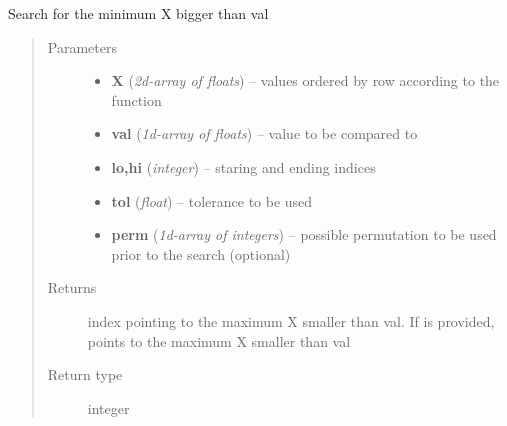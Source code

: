 \documentclass[letterpaper,10pt,english]{sphinxmanual}
\begin{document}

\begin{fulllineitems}
\label{index:SpectralToolbox.Misc.binary_search}
Search for the minimum X bigger than val
\begin{quote}\begin{description}
\item[{Parameters}] \leavevmode\begin{itemize}
\item {} 
\textbf{X} (\emph{2d-array of floats}) -- values ordered by row according to the  function

\item {} 
\textbf{val} (\emph{1d-array of floats}) -- value to be compared to

\item {} 
\textbf{lo,hi} (\emph{integer}) -- staring and ending indices

\item {} 
\textbf{tol} (\emph{float}) -- tolerance to be used

\item {} 
\textbf{perm} (\emph{1d-array of integers}) -- possible permutation to be used prior to the search (optional)

\end{itemize}

\item[{Returns}] \leavevmode
index pointing to the maximum X smaller than val. If  is provided,  points to the maximum X smaller than val

\item[{Return type}] \leavevmode
integer

\end{description}\end{quote}


\end{fulllineitems}
\end{document}
